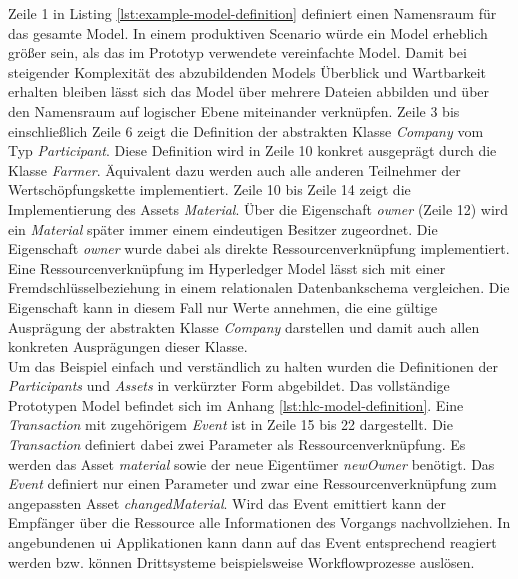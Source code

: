 \noindent
Zeile 1 in Listing \ref{lst:example-model-definition} definiert einen Namensraum für das gesamte Model. In einem produktiven Scenario würde ein Model erheblich größer sein, als das im Prototyp verwendete vereinfachte Model. Damit bei steigender Komplexität des abzubildenden Models Überblick und Wartbarkeit erhalten bleiben lässt sich das Model über mehrere Dateien abbilden und über den Namensraum auf logischer Ebene miteinander verknüpfen. Zeile 3 bis einschließlich Zeile 6 zeigt die Definition der abstrakten Klasse \textit{Company} vom Typ \textit{Participant}. Diese Definition wird in Zeile 10 konkret ausgeprägt durch die Klasse \textit{Farmer}. Äquivalent dazu werden auch alle anderen Teilnehmer der Wertschöpfungskette implementiert. Zeile 10 bis Zeile 14 zeigt die Implementierung des Assets \textit{Material}. Über die Eigenschaft \textit{owner} (Zeile 12) wird ein \textit{Material} später immer einem eindeutigen Besitzer zugeordnet. Die Eigenschaft \textit{owner} wurde dabei als direkte Ressourcenverknüpfung implementiert. Eine Ressourcenverknüpfung im Hyperledger Model lässt sich mit einer Fremdschlüsselbeziehung in einem relationalen Datenbankschema vergleichen. Die Eigenschaft kann in diesem Fall nur Werte annehmen, die eine gültige Ausprägung der abstrakten Klasse \textit{Company} darstellen und damit auch allen konkreten Ausprägungen dieser Klasse.\\

Um das Beispiel einfach und verständlich zu halten wurden die Definitionen der \textit{Participants} und \textit{Assets} in verkürzter Form abgebildet. Das vollständige Prototypen Model befindet sich im Anhang \ref{lst:hlc-model-definition}. Eine \textit{Transaction} mit zugehörigem \textit{Event} ist in Zeile 15 bis 22 dargestellt. Die \textit{Transaction} definiert dabei zwei Parameter als Ressourcenverknüpfung. Es werden das Asset \textit{material} sowie der neue Eigentümer \textit{newOwner} benötigt. Das \textit{Event} definiert nur einen Parameter und zwar eine Ressourcenverknüpfung zum angepassten Asset \textit{changedMaterial}. Wird das Event emittiert kann der Empfänger über die Ressource alle Informationen des Vorgangs nachvollziehen. In angebundenen \ac{ui} Applikationen kann dann auf das Event entsprechend reagiert werden bzw. können Drittsysteme beispielsweise Workflowprozesse auslösen.

